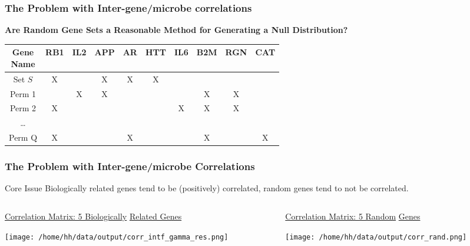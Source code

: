 \documentclass[11pt]{beamer}
\begin{document}
\begin{frame}
  \frametitle{The Problem with Inter-gene/microbe correlations}

  \begin{center}
    \textbf{Are Random Gene Sets a Reasonable Method for Generating a Null Distribution?}
  \end{center}
  
  \begin{center}
    \begin{tabular}{| c | c | c | c | c | c | c | c | c | c |}
      \hline
      \makecell{Gene \\Name} & RB1 & IL2 & APP & AR & HTT & IL6 & B2M & RGN & CAT \\
      \hline
      Set \(S\) & X & & X & X & X & & & & \\
      \hline
      \hline
      Perm 1 & & X & X & & & & X & X & \\
      \hline
      Perm 2 & X & & & & & X & X & X & \\
      \hline
      \dots & & & & & & & & & \\
      \hline
      Perm Q & X & & & X & & & X & & X \\
      \hline
    \end{tabular}
  \end{center}
\end{frame}

\begin{frame}
  \frametitle{The Problem with Inter-gene/microbe Correlations}
  \begin{block}{Core Issue}
    Biologically related genes tend to be (positively) correlated, random genes tend to not be correlated. 
  \end{block}

   \begin{columns}
     \begin{column}{0.5\textwidth}
      \begin{center}
        \underline{Correlation Matrix: 5 Biologically}
        \underline{Related Genes}
        
        \texttt{[image: /home/hh/data/output/corr\_intf\_gamma\_res.png]}
      \end{center}
    \end{column}
    \vrule{}
    \begin{column}{0.5\textwidth}  %
      \begin{center}
        \underline{Correlation Matrix: 5 Random}
        \underline{Genes}
        
        \texttt{[image: /home/hh/data/output/corr\_rand.png]}
      \end{center}
    \end{column}
   \end{columns}
\end{frame}
\end{document}
